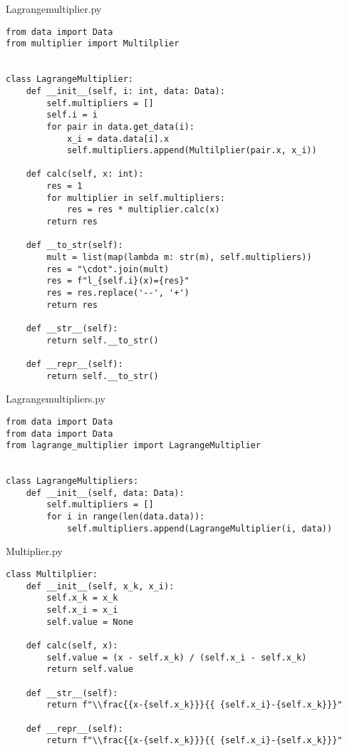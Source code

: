 \documentclass[12pt]{article}
\begin{document}
Lagrangemultiplier.py
\begin{lstlisting}[frame=single]
from data import Data
from multiplier import Multilplier


class LagrangeMultiplier:
    def __init__(self, i: int, data: Data):
        self.multipliers = []
        self.i = i
        for pair in data.get_data(i):
            x_i = data.data[i].x
            self.multipliers.append(Multilplier(pair.x, x_i))

    def calc(self, x: int):
        res = 1
        for multiplier in self.multipliers:
            res = res * multiplier.calc(x)
        return res

    def __to_str(self):
        mult = list(map(lambda m: str(m), self.multipliers))
        res = "\cdot".join(mult)
        res = f"l_{self.i}(x)={res}"
        res = res.replace('--', '+')
        return res

    def __str__(self):
        return self.__to_str()

    def __repr__(self):
        return self.__to_str()
\end{lstlisting}

Lagrangemultipliers.py
\begin{lstlisting}[frame=single]
from data import Data
from data import Data
from lagrange_multiplier import LagrangeMultiplier


class LagrangeMultipliers:
    def __init__(self, data: Data):
        self.multipliers = []
        for i in range(len(data.data)):
            self.multipliers.append(LagrangeMultiplier(i, data))
\end{lstlisting}

Multiplier.py
\begin{lstlisting}[frame=single]
class Multilplier:
    def __init__(self, x_k, x_i):
        self.x_k = x_k
        self.x_i = x_i
        self.value = None

    def calc(self, x):
        self.value = (x - self.x_k) / (self.x_i - self.x_k)
        return self.value

    def __str__(self):
        return f"\\frac{{x-{self.x_k}}}{{ {self.x_i}-{self.x_k}}}"

    def __repr__(self):
        return f"\\frac{{x-{self.x_k}}}{{ {self.x_i}-{self.x_k}}}"
\end{lstlisting}
\end{document}
